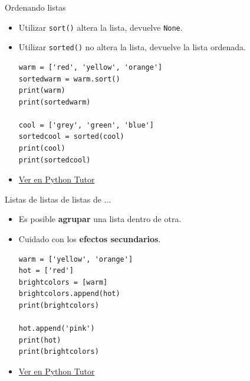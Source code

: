 \documentclass[mathserif]{beamer}
\begin{document}
\begin{frame}[fragile]{Ordenando listas}
    \begin{itemize}
        \item Utilizar \lstinline|sort()| altera la lista, devuelve \lstinline|None|. 
        \item Utilizar \lstinline|sorted()| {\blue no altera} la lista, devuelve la lista ordenada. 

\begin{lstlisting}
warm = ['red', 'yellow', 'orange']
sortedwarm = warm.sort()
print(warm)
print(sortedwarm)

cool = ['grey', 'green', 'blue']
sortedcool = sorted(cool)
print(cool)
print(sortedcool)
\end{lstlisting}

        \item \href{http://pythontutor.com/visualize.html#code=warm%20%3D%20%5B'red',%20'yellow',%20'orange'%5D%0Asortedwarm%20%3D%20warm.sort%28%29%0Aprint%28warm%29%0Aprint%28sortedwarm%29%0A%0Acool%20%3D%20%5B'grey',%20'green',%20'blue'%5D%0Asortedcool%20%3D%20sorted%28cool%29%0Aprint%28cool%29%0Aprint%28sortedcool%29&cumulative=false&heapPrimitives=nevernest&mode=edit&origin=opt-frontend.js&py=3&rawInputLstJSON=%5B%5D&textReferences=false}{Ver en Python Tutor}
    \end{itemize}
\end{frame}

\begin{frame}[fragile]{Listas de listas de listas de ...}
    \begin{itemize}
        \item Es posible {\blue\bfseries agrupar} una lista dentro de otra.
        \item Cuidado con los {\orange\bfseries efectos secundarios}.
    
\begin{lstlisting}
warm = ['yellow', 'orange']
hot = ['red']
brightcolors = [warm]
brightcolors.append(hot)
print(brightcolors)

hot.append('pink')
print(hot)
print(brightcolors)
\end{lstlisting}

        \item \href{http://pythontutor.com/visualize.html#code=warm%20%3D%20%5B'yellow',%20'orange'%5D%0Ahot%20%3D%20%5B'red'%5D%0Abrightcolors%20%3D%20%5Bwarm%5D%0Abrightcolors.append%28hot%29%0Aprint%28brightcolors%29%0A%0Ahot.append%28'pink'%29%0Aprint%28hot%29%0Aprint%28brightcolors%29&cumulative=false&heapPrimitives=nevernest&mode=edit&origin=opt-frontend.js&py=3&rawInputLstJSON=%5B%5D&textReferences=false}{Ver en Python Tutor}
    
    \end{itemize}
\end{frame}
\end{document}
